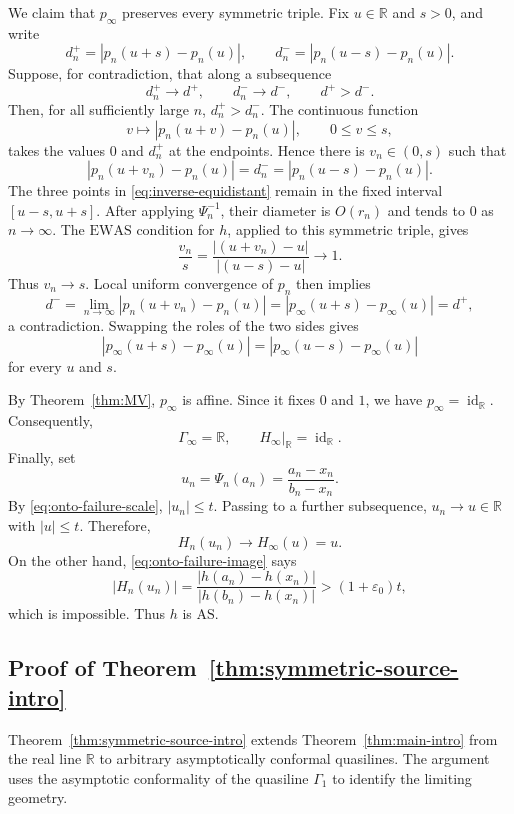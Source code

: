 \documentclass[11pt]{amsart}
\numberwithin{equation}{section}
\theoremstyle{definition} %
\theoremstyle{remarkstyle}
\newcommand{\R}{\mathbb{R}}
\newcommand{\id}{\operatorname{id}}
\begin{document}
We claim that $p_\infty$ preserves every symmetric  triple.  
Fix $u\in\R$ and $s>0$, and write
\[
 d_n^+=|p_n(u+s)-p_n(u)|,
 \qquad
 d_n^-=|p_n(u-s)-p_n(u)|.
\]
Suppose, for contradiction, that along a subsequence
\[
 d_n^+\to  d^+,\qquad d_n^-\to  d^-,\qquad d^+>d^-.
\]
Then, for all sufficiently large $n$, $d_n^+>d_n^-$.  
The continuous function
\[
 v\longmapsto |p_n(u+v)-p_n(u)|,\qquad 0\leq v\leq s,
\]
takes the values $0$ and $d_n^+$ at the endpoints.  
Hence there is $v_n\in(0,s)$ such that
\begin{equation}\label{eq:inverse-equidistant}
 |p_n(u+v_n)-p_n(u)|=d_n^-=|p_n(u-s)-p_n(u)|.
\end{equation}
The three points in \eqref{eq:inverse-equidistant} remain in the fixed interval $[u-s,u+s]$.  
After applying $\Psi_n^{-1}$, their diameter is $O(r_n)$ and tends to $0$ as $n \to \infty$.  
The $\mathrm{EWAS}$ condition for $h$, applied to this symmetric  triple, gives
\[
\frac{v_n}{s}= \frac{|(u+v_n)-u|}{|(u-s)-u|}\to 1.
\]
Thus $v_n\to s$.  
Local uniform convergence of $p_n$ then implies
\[
 d^-=\lim_{n \to \infty}|p_n(u+v_n)-p_n(u)|=|p_\infty(u+s)-p_\infty(u)|=d^+,
\]
a contradiction.  
Swapping the roles of the two sides gives
\begin{equation*}\label{eq:pinfty-isosceles}
 |p_\infty(u+s)-p_\infty(u)|
 =|p_\infty(u-s)-p_\infty(u)|
\end{equation*}
for every $u$ and $s$.

By Theorem~\ref{thm:MV}, $p_\infty$ is affine.  
Since it fixes $0$ and $1$, we have $p_\infty=\id_{\R}$.  
Consequently,
\[
 \Gamma_\infty=\R,\qquad H_\infty|_{\R}=\id_{\R}.
\]
Finally, set
\[
 u_n=\Psi_n(a_n)=\frac{a_n-x_n}{b_n-x_n}.
\]
By \eqref{eq:onto-failure-scale}, $|u_n|\leq t$.  
Passing to a further subsequence, $u_n\to u\in\R$ with $|u|\leq t$.  
Therefore,
\[
 H_n(u_n)\to  H_\infty(u)=u.
\]
On the other hand, \eqref{eq:onto-failure-image} says
\[
 |H_n(u_n)|=\frac{|h(a_n)-h(x_n)|}{|h(b_n)-h(x_n)|}>(1+\varepsilon_0)t,
\]
which is impossible.  
Thus $h$ is $\mathrm{AS}$.



\subsection{Proof of Theorem~\ref{thm:symmetric-source-intro}}

Theorem~\ref{thm:symmetric-source-intro} extends Theorem~\ref{thm:main-intro} from the real line $\mathbb{R}$ to arbitrary asymptotically conformal quasilines.  
The argument uses the asymptotic conformality of the quasiline $\Gamma_1$ to identify the limiting geometry.
\end{document}
